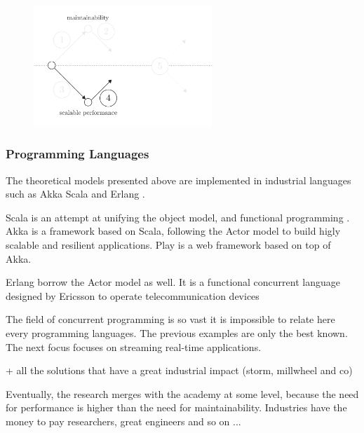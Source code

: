 \begin{figure}[h!]
\begin{center}
\includegraphics[width=0.6\textwidth]{../ressources/state-of-the-art-4.pdf}
\end{center}
\end{figure}


\subsubsection{Programming Languages}

The theoretical models presented above are implemented in industrial languages such as Akka Scala and Erlang \cite{JoeArmstrong} .

Scala is an attempt at unifying the object model, and functional programming \cite{Odersky2004}.
Akka is a framework based on Scala, following the Actor model to build higly scalable and resilient applications.
Play is a web framework based on top of Akka.

Erlang borrow the Actor model as well.
It is a functional concurrent language designed by Ericsson to operate telecommunication devices \cite{JoeArmstrong,Nelson2004} %

The field of concurrent programming is so vast it is impossible to relate here every programming languages.
The previous examples are only the best known.
The next focus focuses on streaming real-time applications.



+ all the solutions that have a great industrial impact (storm, millwheel and co)

Eventually, the research merges with the academy at some level, because the need for performance is higher than the need for maintainability.
Industries have the money to pay researchers, great engineers and so on ...



